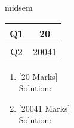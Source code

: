 \documentclass[10pt]{article}
\begin{document}
\vspace*{2cm}
\begin{center}
midsem
\\\vspace*{1cm}
\begin{tabular}{|c|c|}
\hline Q1 & 20 \\ \hline Q2 & 20041 \\ \hline \end{tabular}\end{center}
\begin{enumerate}\item {}\hfill
[20 Marks]
\\ Solution:\vspace*{800pt}\item {}\hfill
[20041 Marks]
\\ Solution:\vspace*{801640pt}\end{enumerate}
\end{document}

